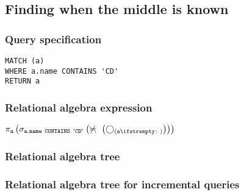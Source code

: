 \subsection{Finding when the middle is known}

\subsubsection*{Query specification}

\begin{lstlisting}
MATCH (a)
WHERE a.name CONTAINS 'CD'
RETURN a
\end{lstlisting}

\subsubsection*{Relational algebra expression}

$\projection{\var{a}} \left(\selection{\mathtt{a.name~CONTAINS~'CD'}} \left(\alldifferent{} \left(\getvertices{a}{}\right)\right)\right)$

\subsubsection*{Relational algebra tree}


\subsubsection*{Relational algebra tree for incremental queries}


